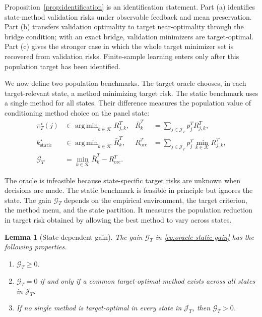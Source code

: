 \documentclass[a4paper, 12pt]{article}
\theoremstyle{plain}
\newtheorem{lemma}{Lemma}
\theoremstyle{remark}
\DeclareMathOperator*{\argmin}{arg\,min}
\newcommand{\Kcal}{\mathcal{K}}
\newcommand{\1}{\mathbf{1}}
\begin{document}
Proposition~\ref{prop:identification} is an identification statement. Part (a) identifies state-method validation risks under observable feedback and mean preservation. Part (b) transfers validation optimality to target near-optimality through the bridge condition; with an exact bridge, validation minimizers are target-optimal. Part (c) gives the stronger case in which the whole target minimizer set is recovered from validation risks. Finite-sample learning enters only after this population target has been identified.

We now define two population benchmarks. The target oracle chooses, in each target-relevant state, a method minimizing target risk. The static benchmark uses a single method for all states. Their difference measures the population value of conditioning method choice on the panel state:
\begin{equation}
\label{eq:oracle-static-gain}
\begin{aligned}
    \pi_T^\star(j)
    &\in
    \argmin_{k\in\Kcal}R^T_{j,k},
    &
    \bar R^T_k
    &=
    \sum_{j\in\mathcal J_T}p^T_jR^T_{j,k},
    \\
    k^\star_{\mathrm{static}}
    &\in
    \argmin_{k\in\Kcal}\bar R^T_k,
    &
    R^T_{\mathrm{orc}}
    &=
    \sum_{j\in\mathcal J_T}p^T_j\min_{k\in\Kcal}R^T_{j,k},
    \\
    \mathcal G_T
    &=
    \min_{k\in\Kcal}\bar R^T_k-R^T_{\mathrm{orc}} .
\end{aligned}
\end{equation}

The oracle is infeasible because state-specific target risks are unknown when decisions are made. The static benchmark is feasible in principle but ignores the state. The gain \(\mathcal G_T\) depends on the empirical environment, the target criterion, the method menu, and the state partition. It measures the population reduction in target risk obtained by allowing the best method to vary across states.

\begin{lemma}[State-dependent gain]
\label{lem:state-dependent-gain}
The gain \(\mathcal G_T\) in \eqref{eq:oracle-static-gain} has the following properties.
\begin{enumerate}[label=(\alph*), leftmargin=*]
    \item \(\mathcal G_T\geq0\).
    \item \(\mathcal G_T=0\) if and only if a common target-optimal method exists across all states in \(\mathcal J_T\).
    \item If no single method is target-optimal in every state in \(\mathcal J_T\), then \(\mathcal G_T>0\).
\end{enumerate}
\end{lemma}
\end{document}
